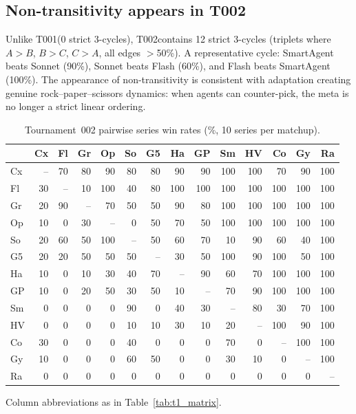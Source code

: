 \documentclass[11pt]{article}
\newcommand{\tOne}{T001}
\newcommand{\tTwo}{T002}
\begin{document}
\subsection{Non-transitivity appears in \tTwo}

Unlike \tOne (0 strict 3-cycles), \tTwo contains 12 strict 3-cycles (triplets where $A>B$, $B>C$, $C>A$, all edges $>$50\%).
A representative cycle: SmartAgent beats Sonnet (90\%), Sonnet beats Flash (60\%), and Flash beats SmartAgent (100\%).
The appearance of non-transitivity is consistent with adaptation creating genuine rock--paper--scissors dynamics: when agents can counter-pick, the meta is no longer a strict linear ordering.

\begin{table}[t]
\centering
\footnotesize
\setlength{\tabcolsep}{2.5pt}
\renewcommand{\arraystretch}{1.05}
\caption{Tournament~002 pairwise series win rates (\%, 10 series per matchup).}
\label{tab:t2_matrix}
\begin{tabular}{lrrrrrrrrrrrrr}
\toprule
 & Cx & Fl & Gr & Op & So & G5 & Ha & GP & Sm & HV & Co & Gy & Ra \\
\midrule
Cx & -- & 70 & 80 & 90 & 80 & 80 & 90 & 90 & 100 & 100 & 70 & 90 & 100 \\
Fl & 30 & -- & 10 & 100 & 40 & 80 & 100 & 100 & 100 & 100 & 100 & 100 & 100 \\
Gr & 20 & 90 & -- & 70 & 50 & 50 & 90 & 80 & 100 & 100 & 100 & 100 & 100 \\
Op & 10 & 0 & 30 & -- & 0 & 50 & 70 & 50 & 100 & 100 & 100 & 100 & 100 \\
So & 20 & 60 & 50 & 100 & -- & 50 & 60 & 70 & 10 & 90 & 60 & 40 & 100 \\
G5 & 20 & 20 & 50 & 50 & 50 & -- & 30 & 50 & 100 & 90 & 100 & 50 & 100 \\
Ha & 10 & 0 & 10 & 30 & 40 & 70 & -- & 90 & 60 & 70 & 100 & 100 & 100 \\
GP & 10 & 0 & 20 & 50 & 30 & 50 & 10 & -- & 70 & 90 & 100 & 100 & 100 \\
Sm & 0 & 0 & 0 & 0 & 90 & 0 & 40 & 30 & -- & 80 & 30 & 70 & 100 \\
HV & 0 & 0 & 0 & 0 & 10 & 10 & 30 & 10 & 20 & -- & 100 & 90 & 100 \\
Co & 30 & 0 & 0 & 0 & 40 & 0 & 0 & 0 & 70 & 0 & -- & 100 & 100 \\
Gy & 10 & 0 & 0 & 0 & 60 & 50 & 0 & 0 & 30 & 10 & 0 & -- & 100 \\
Ra & 0 & 0 & 0 & 0 & 0 & 0 & 0 & 0 & 0 & 0 & 0 & 0 & -- \\
\bottomrule
\end{tabular}
\vspace{0.3em}
\noindent\footnotesize{Column abbreviations as in Table~\ref{tab:t1_matrix}.}
\end{table}
\end{document}
